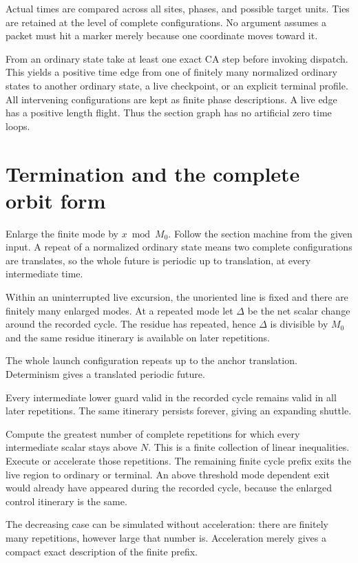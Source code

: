 \documentclass[11pt,letterpaper]{article}
\numberwithin{equation}{section}
\theoremstyle{definition}
\theoremstyle{remark}
\begin{document}
Actual times are compared across all sites, phases, and possible target units. Ties are retained at the level of complete configurations. No argument assumes a packet must hit a marker merely because one coordinate moves toward it.

From an ordinary state take at least one exact CA step before invoking dispatch. This yields a positive time edge from one of finitely many normalized ordinary states to another ordinary state, a live checkpoint, or an explicit terminal profile. All intervening configurations are kept as finite phase descriptions. A live edge has a positive length flight. Thus the section graph has no artificial zero time loops.

\section{Termination and the complete orbit form}\label{smc:zd:sec:termination}
Enlarge the finite mode by $x\bmod M_0$. Follow the section machine from the given input. A repeat of a normalized ordinary state means two complete configurations are translates, so the whole future is periodic up to translation, at every intermediate time.

Within an uninterrupted live excursion, the unoriented line is fixed and there are finitely many enlarged modes. At a repeated mode let $\Delta$ be the net scalar change around the recorded cycle. The residue has repeated, hence $\Delta$ is divisible by $M_0$ and the same residue itinerary is available on later repetitions.
\begin{description}[style=nextline,leftmargin=0pt,labelsep=0pt]
\item[$\Delta=0$] The whole launch configuration repeats up to the anchor translation. Determinism gives a translated periodic future.
\item[$\Delta>0$] Every intermediate lower guard valid in the recorded cycle remains valid in all later repetitions. The same itinerary persists forever, giving an expanding shuttle.
\item[$\Delta<0$] Compute the greatest number of complete repetitions for which every intermediate scalar stays above $N$. This is a finite collection of linear inequalities. Execute or accelerate those repetitions. The remaining finite cycle prefix exits the live region to ordinary or terminal. An above threshold mode dependent exit would already have appeared during the recorded cycle, because the enlarged control itinerary is the same.
\end{description}
The decreasing case can be simulated without acceleration: there are finitely many repetitions, however large that number is. Acceleration merely gives a compact exact description of the finite prefix.
\end{document}

